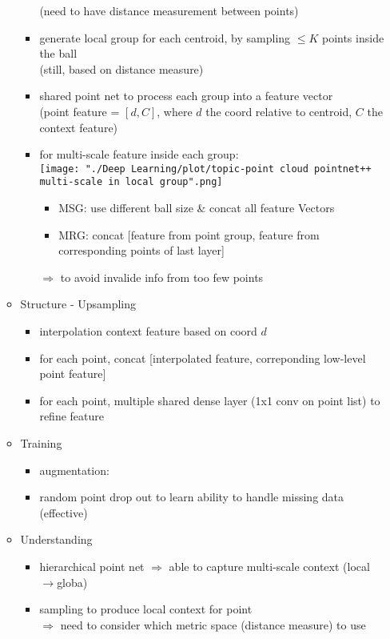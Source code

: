 \begin{itemize}
\begin{itemize}
\begin{itemize}
		(need to have distance measurement between points)
		\item generate local group for each centroid, by sampling $\le K$ points inside the ball \\
		(still, based on distance measure)
		\item shared point net to process each group into a feature vector \\
		(point feature = $[d, C]$, where $d$ the coord relative to centroid, $C$ the context feature)
		\item for multi-scale feature inside each group: \\
		\texttt{[image: "./Deep Learning/plot/topic-point cloud pointnet++ multi-scale in local group".png]}
			\begin{itemize}
			\item MSG: use different ball size \& concat all feature Vectors
			\item MRG: concat [feature from point group, feature from corresponding points of last layer]
			\end{itemize}
		$\Rightarrow$ to avoid invalide info from too few points
		\end{itemize}
	\item Structure - Upsampling
		\begin{itemize}
		\item interpolation context feature based on coord $d$
		\item for each point, concat [interpolated feature, correponding low-level point feature]
		\item for each point, multiple shared dense layer (1x1 conv on point list) to refine feature
		\end{itemize}
	\item Training
		\begin{itemize}
		\item augmentation: 
		\item random point drop out to learn ability to handle missing data (effective)
		\end{itemize}
	\item Understanding
		\begin{itemize}
		\item hierarchical point net $\Rightarrow$ able to capture multi-scale context (local$\rightarrow$globa)
		\item sampling to produce local context for point \\
		$\Rightarrow$ need to consider which metric space (distance measure) to use

\end{itemize}
\end{itemize}
\end{itemize}
